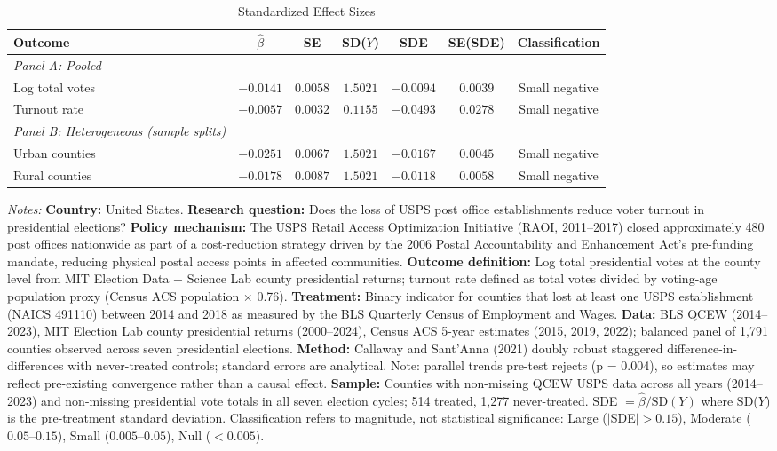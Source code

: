 \begin{table}[htbp]
\centering
\caption{Standardized Effect Sizes}
\label{tab:sde}
\begin{adjustbox}{max width=\textwidth}
\begin{tabular}{lcccccc}
\hline\hline
Outcome & $\hat{\beta}$ & SE & SD($Y$) & SDE & SE(SDE) & Classification \\
\hline
\textit{Panel A: Pooled} & & & & & & \\
Log total votes & $-0.0141$ & $0.0058$ & $1.5021$ & $-0.0094$ & $0.0039$ & Small negative \\
Turnout rate & $-0.0057$ & $0.0032$ & $0.1155$ & $-0.0493$ & $0.0278$ & Small negative \\
[3pt]
\textit{Panel B: Heterogeneous (sample splits)} & & & & & & \\
Urban counties & $-0.0251$ & $0.0067$ & $1.5021$ & $-0.0167$ & $0.0045$ & Small negative \\
Rural counties & $-0.0178$ & $0.0087$ & $1.5021$ & $-0.0118$ & $0.0058$ & Small negative \\
\hline\hline
\end{tabular}
\end{adjustbox}
\begin{tablenotes}
\small
\item \textit{Notes:} \textbf{Country:} United States. \textbf{Research question:} Does the loss of USPS post office establishments reduce voter turnout in presidential elections? \textbf{Policy mechanism:} The USPS Retail Access Optimization Initiative (RAOI, 2011--2017) closed approximately 480 post offices nationwide as part of a cost-reduction strategy driven by the 2006 Postal Accountability and Enhancement Act's pre-funding mandate, reducing physical postal access points in affected communities. \textbf{Outcome definition:} Log total presidential votes at the county level from MIT Election Data + Science Lab county presidential returns; turnout rate defined as total votes divided by voting-age population proxy (Census ACS population $\times$ 0.76). \textbf{Treatment:} Binary indicator for counties that lost at least one USPS establishment (NAICS 491110) between 2014 and 2018 as measured by the BLS Quarterly Census of Employment and Wages. \textbf{Data:} BLS QCEW (2014--2023), MIT Election Lab county presidential returns (2000--2024), Census ACS 5-year estimates (2015, 2019, 2022); balanced panel of 1,791 counties observed across seven presidential elections. \textbf{Method:} Callaway and Sant'Anna (2021) doubly robust staggered difference-in-differences with never-treated controls; standard errors are analytical. Note: parallel trends pre-test rejects (p = 0.004), so estimates may reflect pre-existing convergence rather than a causal effect. \textbf{Sample:} Counties with non-missing QCEW USPS data across all years (2014--2023) and non-missing presidential vote totals in all seven election cycles; 514 treated, 1,277 never-treated. SDE $= \hat{\beta} / \text{SD}(Y)$ where SD($Y$) is the pre-treatment standard deviation. Classification refers to magnitude, not statistical significance: Large ($|$SDE$| > 0.15$), Moderate ($0.05$--$0.15$), Small ($0.005$--$0.05$), Null ($< 0.005$).
\end{tablenotes}
\end{table}
